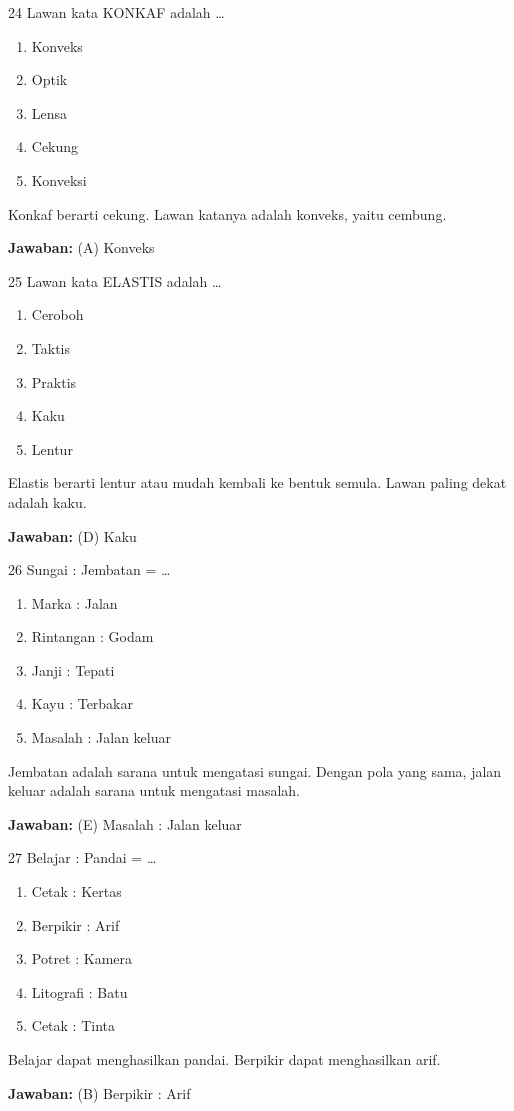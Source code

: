 \documentclass[11pt]{article}
\newenvironment{pil}{\begin{enumerate}[label=(\Alph*),leftmargin=*,itemsep=1pt,topsep=3pt]}{\end{enumerate}}
\newcommand{\jw}[1]{\par\smallskip\begin{jawbox}\textbf{Jawaban:} #1\end{jawbox}}
\begin{document}
\begin{soalbox}{2}{4}
Lawan kata KONKAF adalah \ldots
\begin{pil}\item Konveks \item Optik \item Lensa \item Cekung \item Konveksi\end{pil}
\end{soalbox}
\begin{pembox}
Konkaf berarti cekung. Lawan katanya adalah konveks, yaitu cembung.
\jw{(A) Konveks}
\end{pembox}

\begin{soalbox}{2}{5}
Lawan kata ELASTIS adalah \ldots
\begin{pil}\item Ceroboh \item Taktis \item Praktis \item Kaku \item Lentur\end{pil}
\end{soalbox}
\begin{pembox}
Elastis berarti lentur atau mudah kembali ke bentuk semula. Lawan paling dekat adalah kaku.
\jw{(D) Kaku}
\end{pembox}

\begin{soalbox}{2}{6}
Sungai : Jembatan = \ldots
\begin{pil}\item Marka : Jalan \item Rintangan : Godam \item Janji : Tepati \item Kayu : Terbakar \item Masalah : Jalan keluar\end{pil}
\end{soalbox}
\begin{pembox}
Jembatan adalah sarana untuk mengatasi sungai. Dengan pola yang sama, jalan keluar adalah sarana untuk mengatasi masalah.
\jw{(E) Masalah : Jalan keluar}
\end{pembox}

\begin{soalbox}{2}{7}
Belajar : Pandai = \ldots
\begin{pil}\item Cetak : Kertas \item Berpikir : Arif \item Potret : Kamera \item Litografi : Batu \item Cetak : Tinta\end{pil}
\end{soalbox}
\begin{pembox}
Belajar dapat menghasilkan pandai. Berpikir dapat menghasilkan arif.
\jw{(B) Berpikir : Arif}
\end{pembox}
\end{document}
